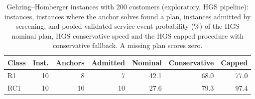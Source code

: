 \begin{table}[t]
\centering
\footnotesize
\setlength{\tabcolsep}{4pt}
\caption{Gehring--Homberger instances with 200 customers (exploratory, HGS pipeline): instances, instances where the anchor solves found a plan, instances admitted by screening, and pooled validated service-event probability (\%) of the HGS nominal plan, HGS conservative speed and the HGS capped procedure with conservative fallback. A missing plan scores zero.}
\label{tab:gh}
\begin{tabular}{@{}lrrrrrr@{}}
\toprule
Class & Inst. & Anchors & Admitted & Nominal & Conservative & Capped\\
\midrule
R1 & 10 & 8 & 7 & 42.1 & 68.0 & 77.0\\
RC1 & 10 & 10 & 10 & 27.6 & 79.3 & 97.4\\
\bottomrule
\end{tabular}
\end{table}
